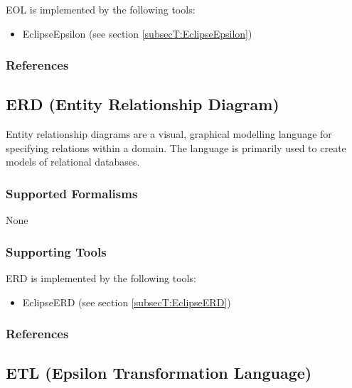 EOL is implemented by the following tools:
\begin{itemize}
	\item EclipseEpsilon (see section \ref{subsecT:EclipseEpsilon})
\end{itemize}


\subsubsection{References}





\subsection{ERD (Entity Relationship Diagram)}
\label{subsecL:ERD}


Entity relationship diagrams are a visual, graphical modelling language for specifying relations within a domain.
The language is primarily used to create models of relational databases.

\subsubsection{Supported Formalisms}

None


\subsubsection{Supporting Tools}

ERD is implemented by the following tools:
\begin{itemize}
	\item EclipseERD (see section \ref{subsecT:EclipseERD})
\end{itemize}


\subsubsection{References}





\subsection{ETL (Epsilon Transformation Language)}
\label{subsecL:ETL}


